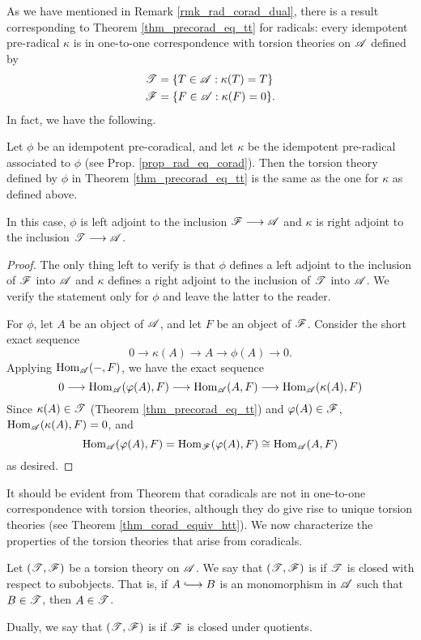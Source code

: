 As we have mentioned in Remark \ref{rmk_rad_corad_dual}, there is
a result corresponding to Theorem \ref{thm_precorad_eq_tt} for 
radicals: every idempotent pre-radical $\kappa$ is in one-to-one 
correspondence with torsion theories on $\mathscr{A}$ defined by
\begin{align*}
\mathscr{T} &= \{ T \in \mathscr{A} : \kappa(T) = T \} \\
\mathscr{F} &= \{ F \in \mathscr{A} : \kappa(F) = 0 \}.
\end{align*}
In fact, we have the following.

\begin{cor}\label{cor_tt_ref_and_coref}
Let $\phi$ be an idempotent pre-coradical, and let $\kappa$ be the 
idempotent pre-radical associated to $\phi$ (see Prop. 
\ref{prop_rad_eq_corad}). Then the torsion theory defined by $\phi$
in Theorem \ref{thm_precorad_eq_tt} is the same as the one for
$\kappa$ as defined above.

In this case, $\phi$ is left adjoint to the inclusion $\mathscr{F} \longrightarrow 
\mathscr{A}$ and $\kappa$ is right adjoint to the inclusion $\mathscr{T} 
\longrightarrow \mathscr{A}$.
\end{cor}
\begin{proof}
The only thing left to verify is that $\phi$ defines a left 
adjoint to the inclusion of $\mathscr{F}$ into $\mathscr{A}$ and $\kappa$ 
defines a right adjoint to the inclusion of $\mathscr{T}$ into 
$\mathscr{A}$. We verify the statement only for $\phi$ and leave the 
latter to the reader.  

For $\phi$, let $A$ be an object of $\mathscr{A}$, and let $F$ be an 
object of $\mathscr{F}$. Consider the short exact sequence
\[
0 \to \kappa(A) \to A \to \phi(A) \to 0.
\]
Applying $\mathrm{Hom}_{\mathscr{A}}(-, F)$, we have the exact sequence
\[
0 \longrightarrow \mathrm{Hom}_{\mathscr{A}}(\varphi(A), F) \longrightarrow \mathrm{Hom}_{\mathscr{A}}(A, F) \longrightarrow
\mathrm{Hom}_{\mathscr{A}}(\kappa(A), F)
\]
Since $\kappa(A) \in \mathscr{T}$ (Theorem \ref{thm_precorad_eq_tt}) 
and $\varphi(A) \in \mathscr{F}$, $\mathrm{Hom}_{\mathscr{A}}(\kappa(A), F) = 0$, and
\[
\mathrm{Hom}_{\mathscr{A}}(\varphi(A), F) = \mathrm{Hom}_{\mathscr{F}}(\varphi(A), F) \cong
   \mathrm{Hom}_{\mathscr{A}}(A, F)
\]
as desired.
\end{proof}

It should be evident from Theorem \cite{thm_precorad_eq_tt} that 
coradicals are not in one-to-one correspondence with torsion 
theories, although they do give rise to unique torsion theories 
(see Theorem \ref{thm_corad_equiv_htt}). We now characterize the 
properties of the torsion theories that arise from coradicals.

\begin{defn}
Let $(\mathscr{T}, \mathscr{F})$ be a torsion theory on $\mathscr{A}$. We say 
that $(\mathscr{T}, \mathscr{F})$ is  if $\mathscr{T}$ is 
closed with respect to subobjects. That is, if $A \into B$ is an 
monomorphism in $\mathscr{A}$ such that $B \in \mathscr{T}$, then $A \in 
\mathscr{T}$.

Dually, we say that $(\mathscr{T}, \mathscr{F})$ is  if
$\mathscr{F}$ is closed under quotients.
\end{defn}

